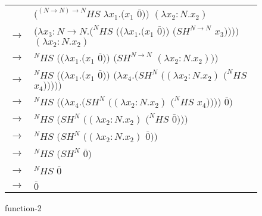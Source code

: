 \begin{figure}[h]
\centering
\begin{tabular}{ll}
\vspace{5pt}

& $(^{(N\rightarrow N)\rightarrow N}HS$ $\lambda x_{1}.(x_{1}$ $\overline{0}))$ $(\lambda x_{2}:N.x_{2})$ \\

\vspace{5pt}

$\rightarrow$ & $(\lambda x_{3}:N\rightarrow N.(^{N}HS$ $((\lambda x_{1}.(x_{1}$ $\overline{0}))$ $(SH^{N\rightarrow N}$ $x_{3}))))$ $(\lambda x_{2}:N.x_{2})$ \\

\vspace{5pt}

$\rightarrow$ & ${^{N}H}S$ $((\lambda x_{1}.(x_{1}$ $\overline{0}))$ $(SH^{N\rightarrow N}$ $(\lambda x_{2}:N.x_{2})))$ \\

\vspace{5pt}

$\rightarrow$ & ${^{N}H}S$ $((\lambda x_{1}.(x_{1}$ $\overline{0}))$ $(\lambda x_{4}.(SH^{N}$ $((\lambda x_{2}:N.x_{2})$ $(^{N}HS$ $x_{4})))))$ \\

\vspace{5pt}

$\rightarrow$ & ${^{N}H}S$ $((\lambda x_{4}.(SH^{N}$ $((\lambda x_{2}:N.x_{2})$ $(^{N}HS$ $x_{4}))))$ $\overline{0})$ \\

\vspace{5pt}

$\rightarrow$ & ${^{N}H}S$ $(SH^{N}$ $((\lambda x_{2}:N.x_{2})$ $(^{N}HS$ $\overline{0})))$ \\

\vspace{5pt}

$\rightarrow$ & ${^{N}H}S$ $(SH^{N}$ $((\lambda x_{2}:N.x_{2})$ $\overline{0}))$ \\

\vspace{5pt}

$\rightarrow$ & ${^{N}H}S$ $(SH^{N}$ $\overline{0})$ \\

\vspace{5pt}

$\rightarrow$ & ${^{N}H}S$ $\overline{0}$ \\

\vspace{5pt}

$\rightarrow$ & $\overline{0}$
\end{tabular}
\caption{function-2}
\label{function-2}
\end{figure}